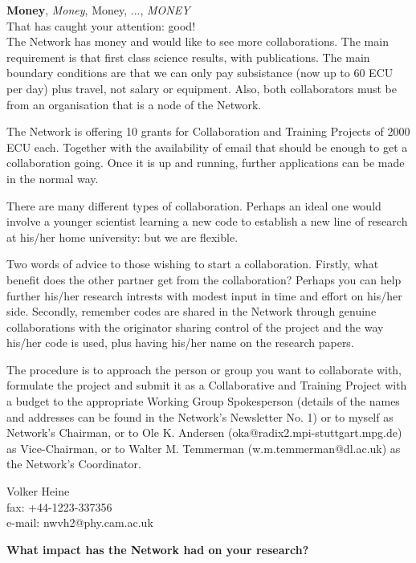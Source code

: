 \vspace{0.5cm}
\noindent
{\Large{\bf Money}, {\Large{\it Money}}, {\Large{Money, ..., {\it MONEY}}}\\

\normalsize
\ni That has caught your attention: good!\\

\ni The Network has money and would like to see more collaborations. The main
requirement is that first class science results, with publications. The main
boundary conditions are that we can only pay subsistance (now up to 60 ECU
per day) plus travel, not salary or equipment. Also, both collaborators must
be from an organisation that is a node of the Network.

\ni The Network is offering 10 grants for Collaboration and Training Projects
of 2000 ECU each. Together with the availability of email that should be enough 
to get a collaboration going. Once it is up and running, further applications can
be made in the normal way.

\ni There are many different types of collaboration. Perhaps an ideal one would
involve a younger scientist learning a new code to establish a new line of
research at his/her home university: but we are flexible.

\ni Two words of advice to those wishing to start a collaboration. Firstly, what
benefit does the other partner get from the collaboration? Perhaps you can help
further his/her research intrests with modest input in time and effort on his/her
side. Secondly, remember codes are shared in the Network through genuine
collaborations with the originator sharing control of the project and the way his/her
code is used, plus having his/her name on the research papers.

\ni The procedure is to approach the person or group you want to collaborate with, 
formulate the project and submit it as a Collaborative and Training Project with
a budget to the appropriate Working Group Spokesperson (details of the names and
addresses can be found in the Network's Newsletter No. 1) or to myself as Network's 
Chairman, or to Ole K. Andersen (oka@radix2.mpi-stuttgart.mpg.de) as Vice-Chairman, 
or to Walter M. Temmerman (w.m.temmerman@dl.ac.uk) as the Network's Coordinator. \\

\begin{flushright}
Volker Heine\\
fax: +44-1223-337356\\
e-mail: nwvh2@phy.cam.ac.uk\\
\end{flushright}
\newpage
\vspace{2cm}
\begin{center}
\Large{\bf What impact has the Network had on your research? \par}
\end{center}

}
